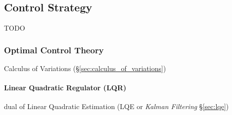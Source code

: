 \subsection{Control Strategy}\label{sec:control_strategy}

TODO



\subsubsection{Optimal Control Theory}\label{sec:optimal_control}

\fist Calculus of Variations (\S\ref{sec:calculus_of_variations})



\paragraph{Linear Quadratic Regulator (LQR)}\label{sec:lqr}\hfill

dual of Linear Quadratic Estimation (LQE or \emph{Kalman Filtering}
\S\ref{sec:lqe})
